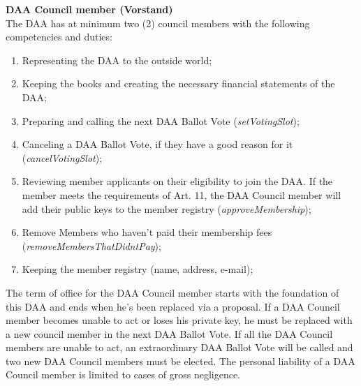 \item \textbf{DAA Council member (Vorstand)} \\
The DAA has at minimum two (2) council members with the following competencies and duties:
\begin{enumerate}
[label=(\alph*)]
    \item Representing the DAA to the outside world;
    \item Keeping the books and creating the necessary financial statements of the DAA;
    \item Preparing and calling the next DAA Ballot Vote (\emph{setVotingSlot});
    \item Canceling a DAA Ballot Vote, if they have a good reason for it (\emph{cancelVotingSlot});
    \item Reviewing member applicants on their eligibility to join the DAA.
    If the member meets the requirements of Art. 11, the DAA Council member will add their public keys to the member registry (\emph{approveMembership});
    \item Remove Members who haven't paid their membership fees (\emph{removeMembersThatDidntPay});
    \item Keeping the member registry (name, address, e-mail);
\end{enumerate}
The term of office for the DAA Council member starts with the foundation of this DAA and ends when he's been replaced via a proposal.
If a DAA Council member becomes unable to act or loses his private key, he must be replaced with a new council member in the next DAA Ballot Vote.
If all the DAA Council members are unable to act, an extraordinary DAA Ballot Vote will be called and two new DAA Council members must be elected.
The personal liability of a DAA Council member is limited to cases of gross negligence.

